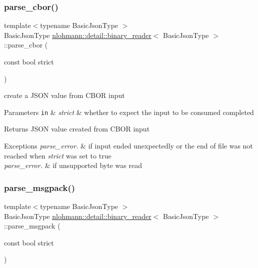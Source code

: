 \subsubsection{\texorpdfstring{parse\+\_\+cbor()}{parse\_cbor()}}
{\footnotesize\ttfamily template$<$typename Basic\+Json\+Type $>$ \\
Basic\+Json\+Type \mbox{\hyperlink{classnlohmann_1_1detail_1_1binary__reader}{nlohmann\+::detail\+::binary\+\_\+reader}}$<$ Basic\+Json\+Type $>$\+::parse\+\_\+cbor (\begin{DoxyParamCaption}\item[{const bool}]{strict }\end{DoxyParamCaption})\hspace{0.3cm}{\ttfamily [inline]}}



create a J\+S\+ON value from C\+B\+OR input 


\begin{DoxyParams}[1]{Parameters}
\mbox{\tt in}  & {\em strict} & whether to expect the input to be consumed completed \\
\hline
\end{DoxyParams}
\begin{DoxyReturn}{Returns}
J\+S\+ON value created from C\+B\+OR input
\end{DoxyReturn}

\begin{DoxyExceptions}{Exceptions}
{\em parse\+\_\+error.} & if input ended unexpectedly or the end of file was not reached when {\itshape strict} was set to true \\
\hline
{\em parse\+\_\+error.} & if unsupported byte was read \\
\hline
\end{DoxyExceptions}
\mbox{\label{classnlohmann_1_1detail_1_1binary__reader_ab4a4a6f5ab3cc77aac374c9c889e580e}} 
\subsubsection{\texorpdfstring{parse\+\_\+msgpack()}{parse\_msgpack()}}
{\footnotesize\ttfamily template$<$typename Basic\+Json\+Type $>$ \\
Basic\+Json\+Type \mbox{\hyperlink{classnlohmann_1_1detail_1_1binary__reader}{nlohmann\+::detail\+::binary\+\_\+reader}}$<$ Basic\+Json\+Type $>$\+::parse\+\_\+msgpack (\begin{DoxyParamCaption}\item[{const bool}]{strict }\end{DoxyParamCaption})\hspace{0.3cm}{\ttfamily [inline]}}




